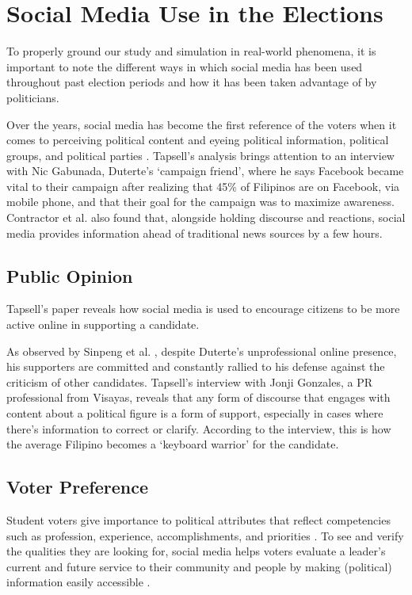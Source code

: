 \section{Social Media Use in the Elections}
To properly ground our study and simulation in real-world phenomena, it is important to note the different ways in which social media has been used throughout past election periods and how it has been taken advantage of by politicians.

Over the years, social media has become the first reference of the voters when it comes to perceiving political content and eyeing political information, political groups, and political parties \cite{Campanero-2021}. Tapsell’s \cite{Tapsell-2020} analysis brings attention to an interview with Nic Gabunada, Duterte’s ‘campaign friend’, where he says Facebook became vital to their campaign after realizing that 45\% of Filipinos are on Facebook, via mobile phone, and that their goal for the campaign was to maximize awareness. Contractor et al. \cite{Contractor-2015} also found that, alongside holding discourse and reactions, social media provides information ahead of traditional news sources by a few hours.

\subsection{Public Opinion}
Tapsell’s \cite{Tapsell-2020} paper reveals how social media is used to encourage citizens to be more active online in supporting a candidate.

As observed by Sinpeng et al. \cite{Sinpeng-2020}, despite Duterte’s unprofessional online presence, his supporters are committed and constantly rallied to his defense against the criticism of other candidates. Tapsell’s \cite{Tapsell-2020} interview with Jonji Gonzales, a PR professional from Visayas, reveals that any form of discourse that engages with content about a political figure is a form of support, especially in cases where there’s information to correct or clarify. According to the interview, this is how the average Filipino becomes a ‘keyboard warrior’ for the candidate.

\subsection{Voter Preference}
Student voters give importance to political attributes that reflect competencies such as profession, experience, accomplishments, and priorities \cite{Anabo-2021}. To see and verify the qualities they are looking for, social media helps voters evaluate a leader’s current and future service to their community and people by making (political) information easily accessible \cite{Campanero-2021}.


